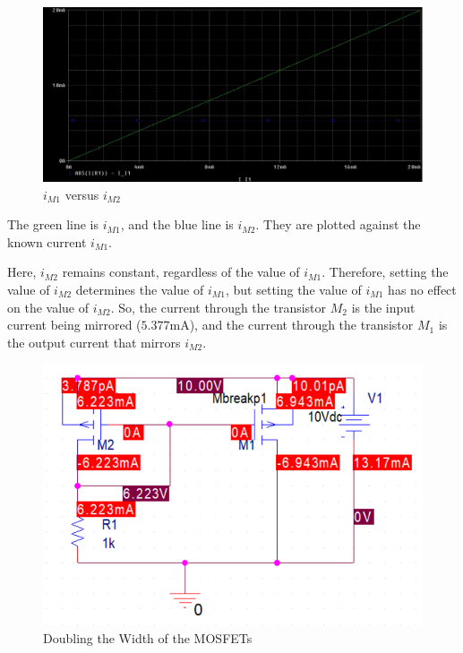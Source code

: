 \FloatBarrier

\FloatBarrier

\begin{figure}[h!]
	\centering
	\includegraphics[scale=0.50]{../images/plot_2.PNG}
	\caption{$i_{M1}$ versus $i_{M2}$}
	\label{fig:plot_2}
\end{figure}

\FloatBarrier

{\footnotesize The green line is $i_{M1}$, and the blue line is $i_{M2}$. They are plotted against the known current $i_{M1}$.}

Here, $i_{M2}$ remains constant, regardless of the value of $i_{M1}$.
Therefore, setting the value of $i_{M2}$ determines the value of $i_{M1}$, but setting the value of $i_{M1}$ has no effect on the value of $i_{M2}$.
So, the current through the transistor $M_2$ is the input current being mirrored ($5.377$\si{\milli\ampere}), and the current through the transistor $M_1$ is the output current that mirrors $i_{M2}$.

\FloatBarrier

\begin{figure}[h!]
	\centering
	\includegraphics[scale=0.75]{../images/double_width_means_double_current.PNG}
	\caption{Doubling the Width of the MOSFETs}
	\label{fig:double_width_means_double_current}
\end{figure}


